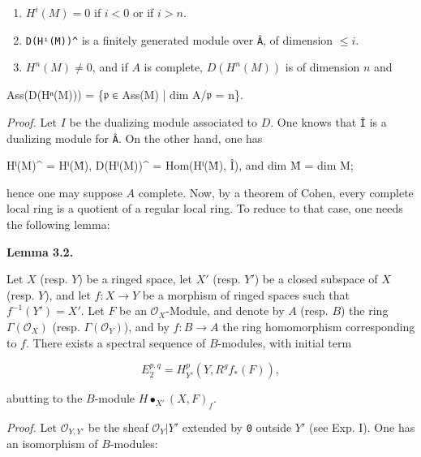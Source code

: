 \documentclass[
]{article}
\newenvironment{Shaded}{}{}
\newcommand{\NormalTok}[1]{#1}
\begin{document}
\begin{enumerate}
\def\labelenumi{(\roman{enumi})}
\item
  \(H^{i}(M) = 0\) if \(i < 0\) or if \(i > n\).
\item
  \texttt{D(Hⁱ(M))\^{}} is a finitely generated module over \texttt{Â},
  of dimension \(\leqslant i\).
\item
  \(H^{n}(M) \neq 0\), and if \(A\) is complete, \(D(H^{n}(M))\) is of
  dimension \(n\) and
\end{enumerate}

\begin{Shaded}
\begin{Highlighting}[]
\NormalTok{Ass(D(Hⁿ(M))) = \{𝔭 ∈ Ass(M) | dim A/𝔭 = n\}.}
\end{Highlighting}
\end{Shaded}

\emph{Proof.} Let \(I\) be the dualizing module associated to \(D\). One
knows that \texttt{Î} is a dualizing module for \texttt{Â}. On the other
hand, one has

\begin{Shaded}
\begin{Highlighting}[]
\NormalTok{Hⁱ(M)\^{} = Hⁱ(M̂),}
\NormalTok{D(Hⁱ(M))\^{} = Hom(Hⁱ(M̂), Î), and}
\NormalTok{dim M̂ = dim M;}
\end{Highlighting}
\end{Shaded}

hence one may suppose \(A\) complete. Now, by a theorem of Cohen, every
complete local ring is a quotient of a regular local ring. To reduce to
that case, one needs the following lemma:

\textbf{Lemma 3.2.}

Let \(X\) (resp. \(Y\)) be a ringed space, let \(X'\) (resp. \(Y'\)) be
a closed subspace of \(X\) (resp. \(Y\)), and let \(f: X \to Y\) be a
morphism of ringed spaces such that \(f^{-1}(Y') = X'\). Let \(F\) be an
\(\mathcal{O}_{X}\)-Module, and denote by \(A\) (resp. \(B\)) the ring
\(\Gamma(\mathcal{O}_{X})\) (resp. \(\Gamma(\mathcal{O}_{Y})\)), and by
\(f: B \to A\) the ring homomorphism corresponding to \(f\). There
exists a spectral sequence of \(B\)-modules, with initial term

\[
E^{p,q}_{2} = H^{p}_{Y'}(Y, R^{g}f_{*}(F)),
\]

abutting to the \(B\)-module \(H\bullet_{X'}(X, F)_{f}\).

\emph{Proof.} Let \(\mathcal{O}_{Y,Y'}\) be the sheaf
\(\mathcal{O}_{Y}|Y'\) extended by \texttt{0} outside \(Y'\) (see Exp.
I). One has an isomorphism of \(B\)-modules:
\end{document}
